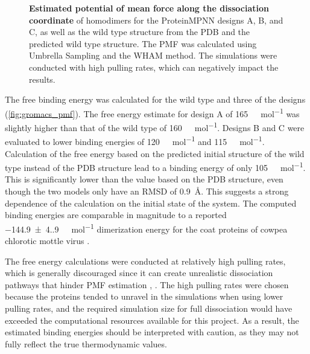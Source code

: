 \begin{figure}
    
    \caption{\textbf{Estimated potential of mean force along the dissociation coordinate} of homodimers for the ProteinMPNN designs A, B, and C, as well as the wild type structure from the PDB and the predicted wild type structure. The PMF was calculated using Umbrella Sampling and the WHAM method. The simulations were conducted with high pulling rates, which can negatively impact the results. }
    \label{fig:gromacs_pmf}
\end{figure}

The free binding energy was calculated for the wild type and three of the designs (\autoref{fig:gromacs_pmf}). The free energy estimate for design A of \SI{165}{\kilo\cal\per\mole} was slightly higher than that of the wild type of \SI{160}{\kilo\cal\per\mole}. Designs B and C were evaluated to lower binding energies of \SI{120}{\kilo\cal\per\mole} and \SI{115}{\kilo\cal\per\mole}. Calculation of the free energy based on the predicted initial structure of the wild type instead of the PDB structure lead to a binding energy of only \SI{105}{\kilo\cal\per\mole}. This is significantly lower than the value based on the PDB structure, even though the two models only have an RMSD of \SI{0.9}{\angstrom}. This suggests a strong dependence of the calculation on the initial state of the system. The computed binding energies are comparable in magnitude to a reported \SI[separate-uncertainty=true]{-144.9(4.9)}{\kilo\cal\per\mole} dimerization energy for the coat proteins of cowpea chlorotic mottle virus \cite{ccmv_binding_energy}. 

The free energy calculations were conducted at relatively high pulling rates, which is generally discouraged since it can create unrealistic dissociation pathways that hinder PMF estimation \cite{lemkul_umbrella_sampling}, \cite{umbrella_sampling_problems}. The high pulling rates were chosen because the proteins tended to unravel in the simulations when using lower pulling rates, and the required simulation size for full dissociation would have exceeded the computational resources available for this project. As a result, the estimated binding energies should be interpreted with caution, as they may not fully reflect the true thermodynamic values.

